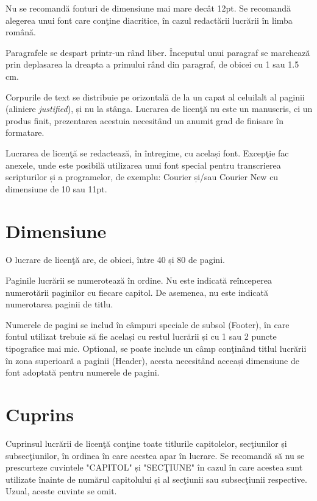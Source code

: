 
Nu se recomandă fonturi de dimensiune mai mare decât 12pt. Se recomandă alegerea unui font care conţine diacritice, în cazul redactării lucrării în limba română.

Paragrafele se despart printr-un rând liber. Începutul unui paragraf se marchează prin deplasarea la dreapta a primului rând din paragraf, de obicei cu 1 sau 1.5 cm.

Corpurile de text se distribuie pe orizontală de la un capat al celuilalt al paginii (aliniere \emph{justified}), și nu la stânga. Lucrarea de licenţă nu este un manuscris, ci un produs finit, prezentarea acestuia necesitând un anumit grad de finisare în formatare.

Lucrarea de licenţă se redactează, în întregime, cu același font. Excepţie fac anexele, unde este posibilă utilizarea unui font special pentru transcrierea scripturilor și a programelor, de exemplu: Courier și/sau Courier New cu dimensiune de 10 sau 11pt.

\section{Dimensiune}

O lucrare de licenţă are, de obicei, între 40 și 80 de pagini.

Paginile lucrării se numerotează în ordine. Nu este indicată reînceperea numerotării paginilor cu fiecare capitol. De asemenea, nu este indicată numerotarea paginii de titlu.

Numerele de pagini se includ în câmpuri speciale de subsol (Footer), în care fontul utilizat trebuie să fie același cu restul lucrării și cu 1 sau 2 puncte tipografice mai mic. Optional, se poate include un câmp conţinând titlul lucrării în zona superioară a paginii (Header), acesta necesitând aceeași dimensiune de font adoptată pentru numerele de pagini.

\section{Cuprins}

Cuprinsul lucrării de licenţă conţine toate titlurile capitolelor, secţiunilor și subsecţiunilor, în ordinea în care acestea apar în lucrare. Se recomandă să nu se prescurteze cuvintele "CAPITOL" și "SECŢIUNE" în cazul în care acestea sunt utilizate înainte de numărul capitolului și al secţiunii sau subsecţiunii respective. Uzual, aceste cuvinte se omit.

